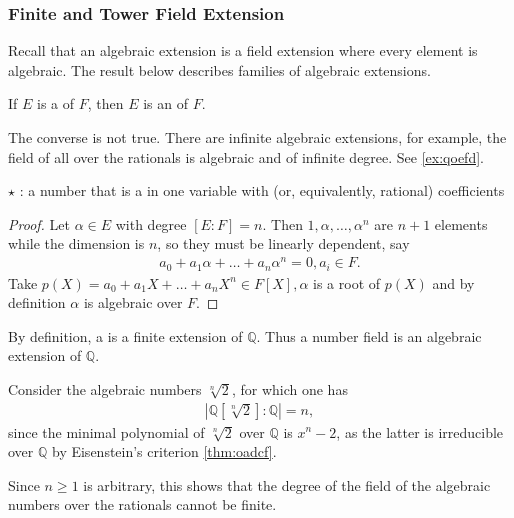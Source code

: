 \documentclass{article}
\begin{document}
\subsubsection{Finite and Tower Field Extension}

Recall that an algebraic extension is a field extension where every element is algebraic. The result below describes families of algebraic extensions.
\begin{thma}\label{thm:ondczfd}
If $E$ is a  of $F$, then $E$ is an  of $F$.
\end{thma} 
\begin{rema}
The converse is not true. There are infinite algebraic extensions, for example, the field of all  over the rationals is algebraic and of infinite degree. See \cref{ex:qoefd}.

$\star$ : a number that is a  in one variable with  (or, equivalently, rational) coefficients
\end{rema}
\begin{proof}
Let $\alpha \in E$ with degree $[E: F]=n$. Then $1, \alpha, \ldots, \alpha^{n}$ are $n+1$ elements while the dimension is $n$, so they must be linearly dependent, say
\begin{align*}
a_{0}+a_{1} \alpha+\ldots+a_{n} \alpha^{n}=0, a_{i} \in F .
\end{align*}
Take $p(X)=a_{0}+a_{1} X+\ldots+a_{n} X^{n} \in F[X], \alpha$ is a root of $p(X)$ and by definition $\alpha$ is algebraic over $F$.
\end{proof}

\begin{cora}
By definition, a  is a finite extension of $\mathbb{Q}$. Thus a number field is an algebraic extension of $\mathbb{Q}$.
\end{cora} 

\begin{exma}\label{ex:qoefd}
Consider the algebraic numbers $\sqrt[n]{2}$, for which one has
\begin{align*}
|\mathbb{Q}[\sqrt[n]{2}]: \mathbb{Q}|=n,
\end{align*}
since the minimal polynomial of $\sqrt[n]{2}$ over $\mathbb{Q}$ is $x^{n}-2$, as the latter is irreducible over $\mathbb{Q}$ by Eisenstein's criterion \cref{thm:oadcf}.

Since $n \geq 1$ is arbitrary, this shows that the degree of the field of the algebraic numbers over the rationals cannot be finite.
\end{exma}
\end{document}
